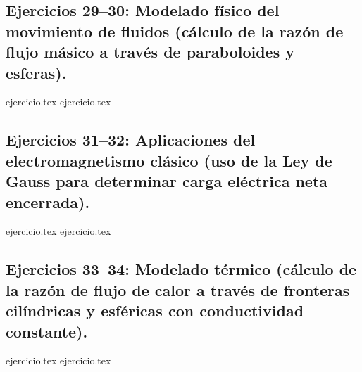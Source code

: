 \subsection*{Ejercicios 29--30: Modelado físico del movimiento de fluidos (cálculo de la razón de flujo másico a través de paraboloides y esferas).}
\begin{enumerate}
    \setcounter{enumi}{28}
    {ejercicio.tex}
    {ejercicio.tex}
\end{enumerate}

\subsection*{Ejercicios 31--32: Aplicaciones del electromagnetismo clásico (uso de la Ley de Gauss para determinar carga eléctrica neta encerrada).}
\begin{enumerate}
    \setcounter{enumi}{30}
    {ejercicio.tex}
    {ejercicio.tex}
\end{enumerate}

\subsection*{Ejercicios 33--34: Modelado térmico (cálculo de la razón de flujo de calor a través de fronteras cilíndricas y esféricas con conductividad constante).}
\begin{enumerate}
    \setcounter{enumi}{32}
    {ejercicio.tex}
    {ejercicio.tex}
\end{enumerate}

